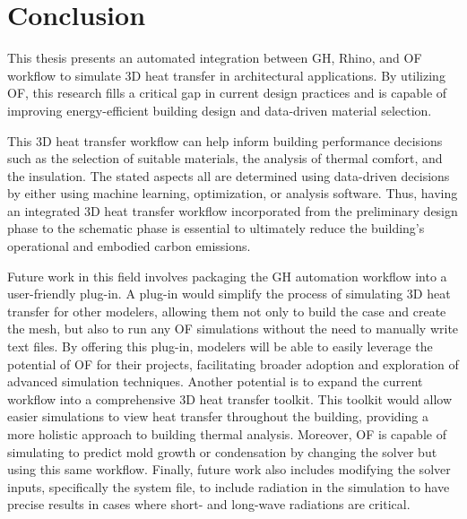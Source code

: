 \chapter{Conclusion}
This thesis presents an automated integration between  \gls{GH}, Rhino, and \gls{OF} workflow to simulate 3D heat transfer in architectural applications. 
By utilizing OF, this research fills a critical gap in current design practices and is capable of improving energy-efficient building design and data-driven material selection. 

This 3D heat transfer workflow can help inform building performance decisions such as the selection of suitable materials, the analysis of thermal comfort, and the insulation.
The stated aspects all are determined using data-driven decisions by either using machine learning, optimization, or analysis software. 
Thus, having an integrated 3D heat transfer workflow incorporated from the preliminary design phase to the schematic phase is essential to ultimately reduce the building's operational and embodied carbon emissions. 

Future work in this field involves packaging the \gls{GH} automation workflow into a user-friendly plug-in. 
A plug-in would simplify the process of simulating 3D heat transfer for other modelers, allowing them not only to build the case and create the mesh, but also to run any \gls{OF} simulations without the need to manually write text files. 
By offering this plug-in, modelers will be able to easily leverage the potential of \gls{OF} for their projects, facilitating broader adoption and exploration of advanced simulation techniques. 
Another potential is to expand the current workflow into a comprehensive 3D heat transfer toolkit. 
This toolkit would allow easier simulations to view heat transfer throughout the building, providing a more holistic approach to building thermal analysis. 
Moreover, \gls{OF} is capable of simulating to predict mold growth or condensation by changing the solver but using this same workflow. 
Finally, future work also includes modifying the solver inputs, specifically the system file, to include radiation in the simulation to have precise results in cases where short- and long-wave radiations are critical. 







